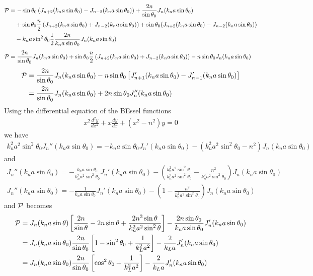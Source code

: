 \begin{align}
    {\cal P} & =-\sin\theta_0\left(J_{n+2}(k_na\sin\theta_0)-J_{n-2}(k_na\sin\theta_0)\right) +\frac{2n}{\sin\theta_0}J_n(k_na\sin\theta_0)\nonumber                                    \\
             & \quad+\sin\theta_0\frac{n}{2}\left(J_{n+2}(k_na\sin\theta_0)+J_{n-2}(k_na\sin\theta_0)\right)+\sin\theta_0(J_{n+2}(k_na\sin\theta_0)-J_{n-2}(k_na\sin\theta_0))\nonumber \\
             & \quad  -k_na\sin^2\theta_0\frac1{2}\frac{2n}{k_na\sin\theta_0}J_{n}(k_na\sin\theta_0)
\end{align}
\begin{align}
    {\cal P} & =\frac{2n}{\sin\theta_0}J_n(k_na\sin\theta_0)+\sin\theta_0\frac{n}{2}\left(J_{n+2}(k_na\sin\theta_0)+J_{n-2}(k_na\sin\theta_0)\right)  -n\sin\theta_0J_{n}(k_na\sin\theta_0)
\end{align}
\begin{align}
    {\cal P} & =\frac{2n}{\sin\theta_0}J_n(k_na\sin\theta_0)-n\sin\theta_0\left[J'_{n+1}(k_na\sin\theta_0)-J'_{n-1}(k_na\sin\theta_0)\right]\nonumber \\
             & =\frac{2n}{\sin\theta_0}J_n(k_na\sin\theta_0)+2n\sin\theta_0J''_{n}(k_na\sin\theta_0)
\end{align}
Using the differential equation of the BEssel functions
\begin{align}
    x^2 \frac{d^2 y}{d x^2}+x \frac{d y}{d x}+\left(x^2-n^2\right) y=0
\end{align}
we have
\begin{align}
    k_n^2 a^2\sin^2\theta_0 J_n''(k_na\sin\theta_0)=-k_na\sin\theta_0 J_n'(k_na \sin\theta_0)-(k_n^2a^2\sin^2\theta_0-n^2)J_n(k_na\sin\theta_0)
\end{align}
and
\begin{align}
    J_n''(k_na\sin\theta_0)=-\frac{k_na\sin\theta_0}{k_n^2 a^2\sin^2\theta_0} J_n'(k_na \sin\theta_0)-(\frac{k_n^2a^2\sin^2\theta_0}{k_n^2 a^2\sin^2\theta_0}-\frac{n^2}{k_n^2 a^2\sin^2\theta_0})J_n(k_na\sin\theta_0)
\end{align}
\begin{align}
    J_n''(k_na\sin\theta_0)=-\frac{1}{k_n a\sin\theta_0} J_n'(k_na \sin\theta_0)-(1-\frac{n^2}{k_n^2 a^2\sin^2\theta_0})J_n(k_na\sin\theta_0)
\end{align}
and ${\cal P}$ becomes
\begin{align}
    {\cal P} & =J_n(k_na\sin\theta)\left[\frac{2n}{\sin\theta}-2n \sin\theta+\frac{2n^3\sin\theta}{k_n^2a^2\sin^2\theta}\right]-\frac{2n\sin\theta_0}{k_na\sin\theta_0}J_n'(k_na\sin\theta_0)\nonumber \\
             & =J_n(k_na\sin\theta_0)\frac{2n}{\sin\theta_0}\left[1- \sin^2\theta_0+\frac1{k_L^2a^2}\right]-\frac{2}{k_La}J_n'(k_na\sin\theta_0)\nonumber                                              \\
             & =J_n(k_na\sin\theta_0)\frac{2n}{\sin\theta_0}\left[\cos^2\theta_0+\frac1{k_L^2a^2}\right]-\frac{2}{k_La}J_n'(k_na\sin\theta_0)
\end{align}

